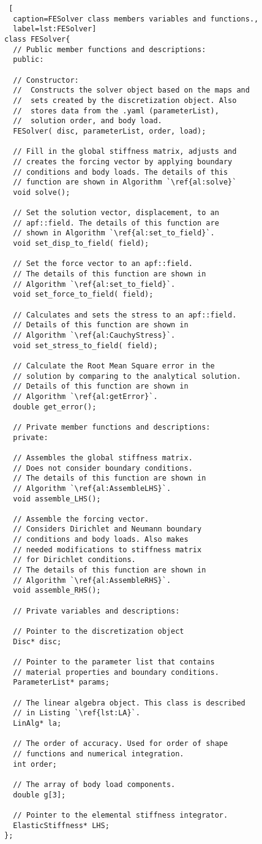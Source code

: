 \documentclass[a4paper, 12pt]{article}
\begin{document}
\begin{lstlisting} [
  caption=FESolver class members variables and functions.,
  label=lst:FESolver]
class FESolver{
  // Public member functions and descriptions:
  public:

  // Constructor:
  //  Constructs the solver object based on the maps and
  //  sets created by the discretization object. Also 
  //  stores data from the .yaml (parameterList), 
  //  solution order, and body load.
  FESolver( disc, parameterList, order, load);

  // Fill in the global stiffness matrix, adjusts and 
  // creates the forcing vector by applying boundary
  // conditions and body loads. The details of this 
  // function are shown in Algorithm `\ref{al:solve}`
  void solve();

  // Set the solution vector, displacement, to an
  // apf::field. The details of this function are
  // shown in Algorithm `\ref{al:set_to_field}`.
  void set_disp_to_field( field);

  // Set the force vector to an apf::field.
  // The details of this function are shown in 
  // Algorithm `\ref{al:set_to_field}`.
  void set_force_to_field( field);

  // Calculates and sets the stress to an apf::field.
  // Details of this function are shown in
  // Algorithm `\ref{al:CauchyStress}`.
  void set_stress_to_field( field);

  // Calculate the Root Mean Square error in the 
  // solution by comparing to the analytical solution.
  // Details of this function are shown in
  // Algorithm `\ref{al:getError}`.
  double get_error();

  // Private member functions and descriptions:
  private:

  // Assembles the global stiffness matrix. 
  // Does not consider boundary conditions.
  // The details of this function are shown in 
  // Algorithm `\ref{al:AssembleLHS}`.
  void assemble_LHS();

  // Assemble the forcing vector. 
  // Considers Dirichlet and Neumann boundary 
  // conditions and body loads. Also makes
  // needed modifications to stiffness matrix 
  // for Dirichlet conditions.
  // The details of this function are shown in 
  // Algorithm `\ref{al:AssembleRHS}`.
  void assemble_RHS();

  // Private variables and descriptions:

  // Pointer to the discretization object
  Disc* disc;

  // Pointer to the parameter list that contains 
  // material properties and boundary conditions.
  ParameterList* params;

  // The linear algebra object. This class is described
  // in Listing `\ref{lst:LA}`.
  LinAlg* la;

  // The order of accuracy. Used for order of shape 
  // functions and numerical integration. 
  int order;

  // The array of body load components.
  double g[3];

  // Pointer to the elemental stiffness integrator.
  ElasticStiffness* LHS;
};
\end{lstlisting}
\vspace{\baselineskip}
\end{document}
